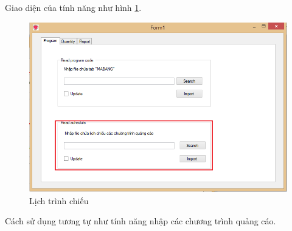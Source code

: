 \documentclass[11pt]{article}
\begin{document}
\indent Giao diện của tính năng như hình \ref{schedule}.\\
\begin{figure}[h!]
	\begin{center}
		\includegraphics[width=15cm]{schedule.png}
	\end{center}
	\caption{Lịch trình chiếu}
	\label{schedule}
\end{figure}

\indent Cách sử dụng tương tự như tính năng nhập các chương trình quảng cáo.
\end{document}
